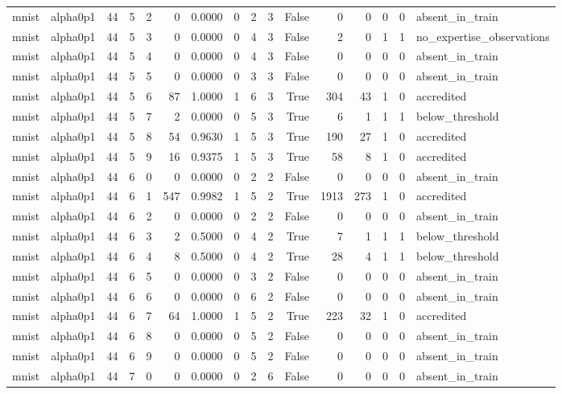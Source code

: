 \begin{tabular}{llrrrrrrrrrrrrrl}
mnist & alpha0p1 & 44 & 5 & 2 & 0 & 0.0000 & 0 & 2 & 3 & False & 0 & 0 & 0 & 0 & absent\_in\_train \\
mnist & alpha0p1 & 44 & 5 & 3 & 0 & 0.0000 & 0 & 4 & 3 & False & 2 & 0 & 1 & 1 & no\_expertise\_observations \\
mnist & alpha0p1 & 44 & 5 & 4 & 0 & 0.0000 & 0 & 4 & 3 & False & 0 & 0 & 0 & 0 & absent\_in\_train \\
mnist & alpha0p1 & 44 & 5 & 5 & 0 & 0.0000 & 0 & 3 & 3 & False & 0 & 0 & 0 & 0 & absent\_in\_train \\
mnist & alpha0p1 & 44 & 5 & 6 & 87 & 1.0000 & 1 & 6 & 3 & True & 304 & 43 & 1 & 0 & accredited \\
mnist & alpha0p1 & 44 & 5 & 7 & 2 & 0.0000 & 0 & 5 & 3 & True & 6 & 1 & 1 & 1 & below\_threshold \\
mnist & alpha0p1 & 44 & 5 & 8 & 54 & 0.9630 & 1 & 5 & 3 & True & 190 & 27 & 1 & 0 & accredited \\
mnist & alpha0p1 & 44 & 5 & 9 & 16 & 0.9375 & 1 & 5 & 3 & True & 58 & 8 & 1 & 0 & accredited \\
mnist & alpha0p1 & 44 & 6 & 0 & 0 & 0.0000 & 0 & 2 & 2 & False & 0 & 0 & 0 & 0 & absent\_in\_train \\
mnist & alpha0p1 & 44 & 6 & 1 & 547 & 0.9982 & 1 & 5 & 2 & True & 1913 & 273 & 1 & 0 & accredited \\
mnist & alpha0p1 & 44 & 6 & 2 & 0 & 0.0000 & 0 & 2 & 2 & False & 0 & 0 & 0 & 0 & absent\_in\_train \\
mnist & alpha0p1 & 44 & 6 & 3 & 2 & 0.5000 & 0 & 4 & 2 & True & 7 & 1 & 1 & 1 & below\_threshold \\
mnist & alpha0p1 & 44 & 6 & 4 & 8 & 0.5000 & 0 & 4 & 2 & True & 28 & 4 & 1 & 1 & below\_threshold \\
mnist & alpha0p1 & 44 & 6 & 5 & 0 & 0.0000 & 0 & 3 & 2 & False & 0 & 0 & 0 & 0 & absent\_in\_train \\
mnist & alpha0p1 & 44 & 6 & 6 & 0 & 0.0000 & 0 & 6 & 2 & False & 0 & 0 & 0 & 0 & absent\_in\_train \\
mnist & alpha0p1 & 44 & 6 & 7 & 64 & 1.0000 & 1 & 5 & 2 & True & 223 & 32 & 1 & 0 & accredited \\
mnist & alpha0p1 & 44 & 6 & 8 & 0 & 0.0000 & 0 & 5 & 2 & False & 0 & 0 & 0 & 0 & absent\_in\_train \\
mnist & alpha0p1 & 44 & 6 & 9 & 0 & 0.0000 & 0 & 5 & 2 & False & 0 & 0 & 0 & 0 & absent\_in\_train \\
mnist & alpha0p1 & 44 & 7 & 0 & 0 & 0.0000 & 0 & 2 & 6 & False & 0 & 0 & 0 & 0 & absent\_in\_train \\

\end{tabular}
